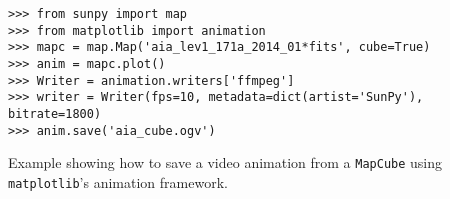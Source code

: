 \begin{listing}[H]
\begin{verbatim}
>>> from sunpy import map
>>> from matplotlib import animation
>>> mapc = map.Map('aia_lev1_171a_2014_01*fits', cube=True)
>>> anim = mapc.plot()
>>> Writer = animation.writers['ffmpeg']
>>> writer = Writer(fps=10, metadata=dict(artist='SunPy'), bitrate=1800)
>>> anim.save('aia_cube.ogv')
\end{verbatim}
\caption{Example showing how to save a video animation from a \texttt{MapCube} using 
\texttt{matplotlib}'s animation framework.}
\label{code:mapcube_2}
\end{listing}

